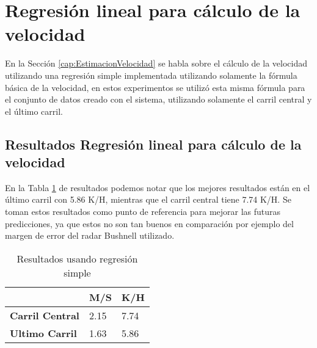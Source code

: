 \section{Regresión lineal para cálculo de la velocidad}

En la Sección \ref{cap:EstimacionVelocidad} se habla sobre el cálculo de la velocidad utilizando una regresión simple implementada utilizando solamente la fórmula básica de la velocidad, en estos experimentos se utilizó esta misma fórmula para el conjunto de datos creado con el sistema, utilizando solamente el carril central y el último carril.

\subsection{Resultados Regresión lineal para cálculo de la velocidad}

En la Tabla \ref{tab:resultadosRLS} de resultados podemos notar que los mejores resultados están en el último carril con 5.86 K/H, mientras que el carril central tiene 7.74 K/H. Se toman estos resultados como punto de referencia para mejorar las futuras predicciones, ya que estos no son tan buenos en comparación por ejemplo del margen de error del radar Bushnell utilizado.

\begin{table}[H]
    \centering
    \caption{Resultados usando regresión simple}
    \label{tab:resultadosRLS}
    \begin{tabular}{|l|l|l|}
    \hline
    \textbf{} & \textbf{M/S} & \textbf{K/H} \\ \hline
    \textbf{Carril Central} & 2.15 & 7.74 \\ \hline
    \textbf{Ultimo Carril}  & 1.63 & 5.86 \\ \hline
    \end{tabular}
\end{table}
